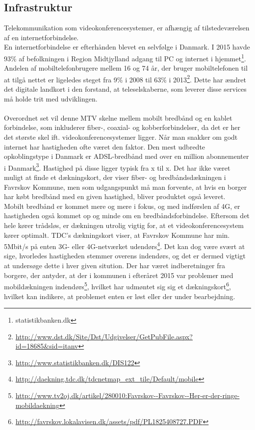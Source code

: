\subsection{Infrastruktur}
Telekommunikation som videokonferencesystemer, er afhængig af tilstedeværelsen af en  internetforbindelse.\\
En internetforbindelse er efterhånden blevet en selvfølge i Danmark. I 2015 havde 93\% af befolkningen i Region Midtjylland adgang til PC og internet i hjemmet\footnote{statistikbanken.dk}. Andelen af mobiltelefonbrugere mellem 16 og 74 år, der bruger mobiltelefonen til at tilgå nettet er ligeledes steget fra 9\% i 2008 til 63\% i 2013\footnote{\url{http://www.dst.dk/Site/Dst/Udgivelser/GetPubFile.aspx?id=18685&sid=itanv}}. Dette har ændret det digitale landkort i den forstand, at teleselskaberne, som leverer disse services må holde trit med udviklingen.\\ \\
Overordnet set vil denne MTV skelne mellem mobilt bredbånd og en kablet forbindelse, som inkluderer fiber-, coaxial- og kobberforbindelser, da det er her det største skel ift. videokonferencesystemer ligger.
Når man snakker om godt internet har hastigheden ofte været den faktor. Den mest udbredte opkoblingstype i Danmark er ADSL-bredbånd med over en million abonnementer i Danmark\footnote{\url{http://www.statistikbanken.dk/DIS122}}. Hastighed på disse ligger typisk fra x til x. Det har ikke været muligt at finde et dækningskort, der viser fiber- og bredbåndsdækningen i Favrskov Kommune, men som udgangspunkt må man forvente, at hvis en borger har købt bredbånd med en given hastighed, bliver produktet også leveret.\\
Mobilt bredbånd er kommet mere og mere i fokus, og med indførslen af 4G, er hastigheden også kommet op og minde om en bredbåndsforbindelse. Eftersom det hele kører trådsløs, er dækningen utrolig vigtig for, at et videokonferencesystem kører optimalt. TDC's dækningskort viser, at Favrskov Kommune har min. 5Mbit/s på enten 3G- eller 4G-netværket udendørs\footnote{\url{http://daekning.tdc.dk/tdcnetmap_ext_tile/Default/mobile}}. Det kan dog være svært at sige, hvorledes hastigheden stemmer overens indendørs, og det er dermed vigtigt at undersøge dette i hver given sitution. Der har været indberetninger fra borgere, der antyder, at der i kommunen i efteråret 2015 var problemer med mobildækningen indendørs\footnote{\url{http://www.tv2oj.dk/artikel/280010:Favrskov--Favrskov--Her-er-der-ringe-mobildaekning}}, hvilket har udmøntet sig sig et dækningskort\footnote{\url{http://favrskov.lokalavisen.dk/assets/pdf/PL1825408727.PDF}}, hvilket kan indikere, at problemet enten er løst eller der under bearbejdning.

